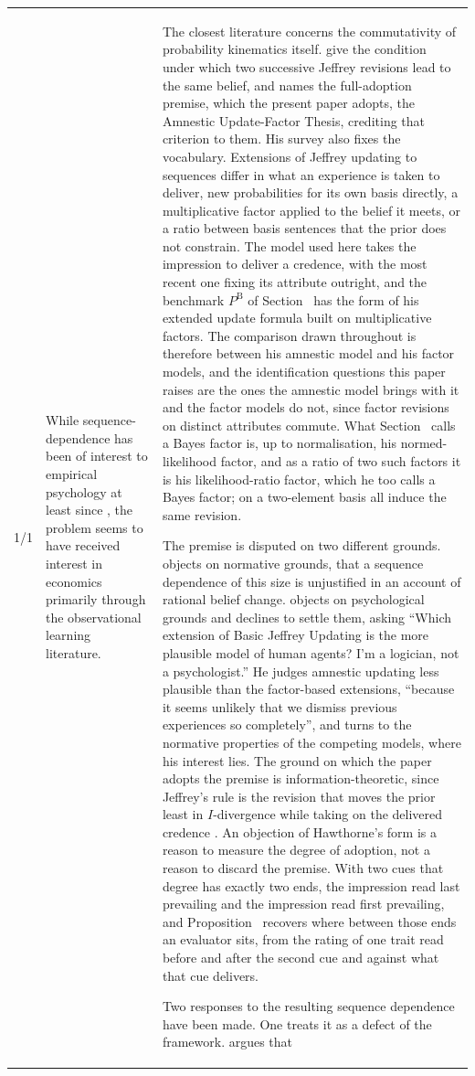 \documentclass[10pt]{article}
\theoremstyle{definition}
\newcommand{\PB}{P^{\mathrm{B}}}
\renewcommand{\ref}[1]{\textsc{\detokenize{#1}}}
\begin{document}
{\begin{longtable}{|p{0.9cm}|p{12.2cm}|p{12.2cm}|}
1/1 & While sequence-dependence has been of interest to empirical psychology at least since \citet{Asch1946}, the problem seems to have received interest in economics primarily through the observational learning literature. & The closest literature concerns the commutativity of probability kinematics itself. \citet{DiaconisZabell1982} give the condition under which two successive Jeffrey revisions lead to the same belief, and \citet{Hawthorne2004} names the full-adoption premise, which the present paper adopts, the Amnestic Update-Factor Thesis, crediting that criterion to them. His survey also fixes the vocabulary. Extensions of Jeffrey updating to sequences differ in what an experience is taken to deliver, new probabilities for its own basis directly, a multiplicative factor applied to the belief it meets, or a ratio between basis sentences that the prior does not constrain. The model used here takes the impression to deliver a credence, with the most recent one fixing its attribute outright, and the benchmark $\PB$ of Section~\ref{sec:jeffrey} has the form of his extended update formula built on multiplicative factors. The comparison drawn throughout is therefore between his amnestic model and his factor models, and the identification questions this paper raises are the ones the amnestic model brings with it and the factor models do not, since factor revisions on distinct attributes commute. What Section~\ref{sec:jeffrey} calls a Bayes factor is, up to normalisation, his normed-likelihood factor, and as a ratio of two such factors it is his likelihood-ratio factor, which he too calls a Bayes factor; on a two-element basis all induce the same revision. \par The premise is disputed on two different grounds. \citet{Doring1999} objects on normative grounds, that a sequence dependence of this size is unjustified in an account of rational belief change. \citet[p.~115]{Hawthorne2004} objects on psychological grounds and declines to settle them, asking ``Which extension of Basic Jeffrey Updating is the more plausible model of human agents? I'm a logician, not a psychologist.'' He judges amnestic updating less plausible than the factor-based extensions, ``because it seems unlikely that we dismiss previous experiences so completely'', and turns to the normative properties of the competing models, where his interest lies. The ground on which the paper adopts the premise is information-theoretic, since Jeffrey's rule is the revision that moves the prior least in $I$-divergence while taking on the delivered credence \citep{DiaconisZabell1982}. An objection of Hawthorne's form is a reason to measure the degree of adoption, not a reason to discard the premise. With two cues that degree has exactly two ends, the impression read last prevailing and the impression read first prevailing, and Proposition~\ref{prop:ADJ} recovers where between those ends an evaluator sits, from the rating of one trait read before and after the second cue and against what that cue delivers. \par Two responses to the resulting sequence dependence have been made. One treats it as a defect of the framework. \citet{Doring1999} argues that 
\end{longtable}}
\end{document}
